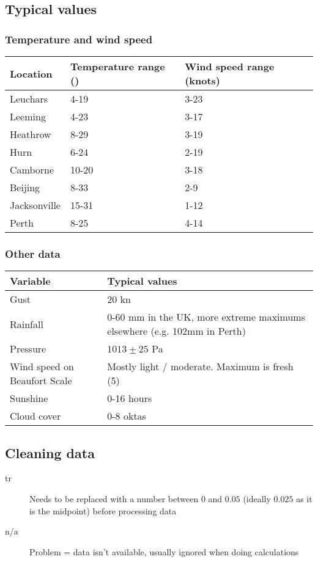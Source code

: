 \subsection{Typical values}
\subsubsection{Temperature and wind speed}
\begin{tabular}{|l|l|l|}
	\hline
	\textbf{Location} & \textbf{Temperature range (\textcelsius)}& \textbf{Wind speed range (knots)} \\
	\hline
	Leuchars & 4-19 & 3-23 \\
	\hline
	Leeming & 4-23 & 3-17 \\
	\hline
	Heathrow & 8-29 & 3-19 \\
	\hline
	Hurn & 6-24 & 2-19 \\
	\hline
	Camborne & 10-20 & 3-18 \\
	\hline
	Beijing & 8-33 & 2-9 \\
	\hline
	Jacksonville & 15-31 & 1-12 \\
	\hline
	Perth & 8-25 & 4-14 \\
	\hline
\end{tabular}

\subsubsection{Other data}
\begin{tabular}{|p{4.8cm} | p{12.2cm}|}
	\hline
	\textbf{Variable} & \textbf{Typical values} \\
	\hline
	Gust & 20 kn \\
	\hline
	Rainfall & 0-60 mm in the UK, more extreme maximums elsewhere (e.g. 102mm in Perth) \\
	\hline
	Pressure & $1013 \pm 25$ Pa \\
	\hline
	Wind speed on Beaufort Scale & Mostly light / moderate. Maximum is fresh (5) \\
	\hline
	Sunshine & 0-16 hours \\
	\hline
	Cloud cover & 0-8 oktas \\
	\hline
\end{tabular}

\subsection{Cleaning data}
\begin{description}
	\item[tr] Needs to be replaced with a number between $0$ and $0.05$ (ideally $0.025$ as it is the midpoint) before processing data
	\item[n/a] Problem = data isn't available, usually ignored when doing calculations
\end{description}




